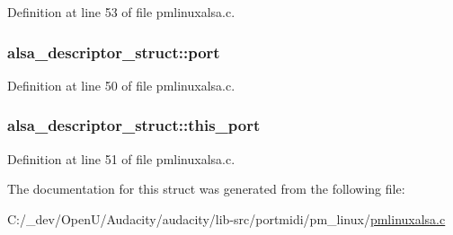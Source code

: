 Definition at line 53 of file pmlinuxalsa.\+c.

\subsubsection[{\texorpdfstring{port}{port}}]{ alsa\+\_\+descriptor\+\_\+struct\+::port}\hypertarget{structalsa__descriptor__struct_af44fabb4f59f5e7140a0886137694914}{}\label{structalsa__descriptor__struct_af44fabb4f59f5e7140a0886137694914}


Definition at line 50 of file pmlinuxalsa.\+c.

\subsubsection[{\texorpdfstring{this\+\_\+port}{this_port}}]{ alsa\+\_\+descriptor\+\_\+struct\+::this\+\_\+port}\hypertarget{structalsa__descriptor__struct_a99d58c148eddf8bea8f1fbc67c8d640d}{}\label{structalsa__descriptor__struct_a99d58c148eddf8bea8f1fbc67c8d640d}


Definition at line 51 of file pmlinuxalsa.\+c.



The documentation for this struct was generated from the following file\+:\begin{DoxyCompactItemize}
\item 
C\+:/\+\_\+dev/\+Open\+U/\+Audacity/audacity/lib-\/src/portmidi/pm\+\_\+linux/\hyperlink{pmlinuxalsa_8c}{pmlinuxalsa.\+c}\end{DoxyCompactItemize}
